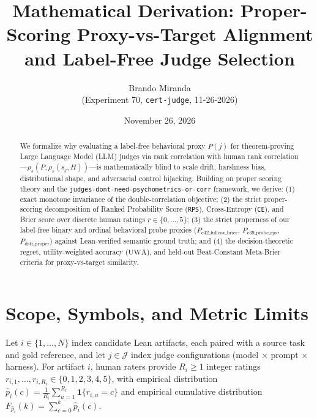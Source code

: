 \documentclass[11pt]{article}
\title{Mathematical Derivation: Proper-Scoring Proxy-vs-Target Alignment and Label-Free Judge Selection}
\author{Brando Miranda \\ \small (Experiment 70, \texttt{cert-judge}, 11-26-2026)}
\date{November 26, 2026}
\begin{document}
\maketitle

\begin{abstract}
We formalize why evaluating a label-free behavioral proxy $P(j)$ for theorem-proving Large Language Model (LLM) judges via rank correlation with human rank correlation---$\rho_s(P, \rho_s(s_j, H))$---is mathematically blind to scale drift, harshness bias, distributional shape, and adversarial control hijacking. Building on proper scoring theory and the \texttt{judges-dont-need-psychometrics-or-corr} framework, we derive: (1) exact monotone invariance of the double-correlation objective; (2) the strict proper-scoring decomposition of Ranked Probability Score (\texttt{RPS}), Cross-Entropy (\texttt{CE}), and Brier score over discrete human ratings $r \in \{0,\dots,5\}$; (3) the strict properness of our label-free binary and ordinal behavioral probe proxies ($P_{\mathrm{e42\_fullcov\_brier}}$, $P_{\mathrm{e39\_probe\_rps}}$, $P_{\mathrm{dsti\_proper}}$) against Lean-verified semantic ground truth; and (4) the decision-theoretic regret, utility-weighted accuracy ($\mathrm{UWA}$), and held-out Beat-Constant Meta-Brier criteria for proxy-vs-target similarity.
\end{abstract}

\section{Scope, Symbols, and Metric Limits}

Let $i \in \{1,\dots,N\}$ index candidate Lean artifacts, each paired with a source task and gold reference, and let $j \in \mathcal{J}$ index judge configurations (model $\times$ prompt $\times$ harness). For artifact $i$, human raters provide $R_i \ge 1$ integer ratings $r_{i,1}, \dots, r_{i,R_i} \in \{0,1,2,3,4,5\}$, with empirical distribution $\hat p_i(c) = \frac{1}{R_i}\sum_{u=1}^{R_i}\mathbf{1}\{r_{i,u}=c\}$ and empirical cumulative distribution $F_{\hat p_i}(k) = \sum_{c=0}^k \hat p_i(c)$.
\end{document}

